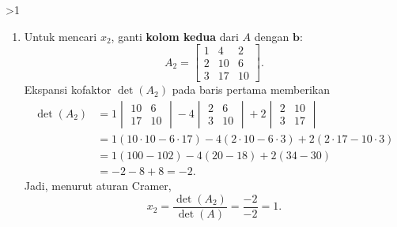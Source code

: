 \documentclass[12pt]{article}
\newenvironment{soaljawab}[1]{%
    \ifnum#1>1\clearpage\fi
    \begin{tcolorbox}[enhanced,breakable,height fill,height fixed for=all,
        sharp corners,colback=white,colframe=black,boxrule=0.4bp,
        boxsep=0pt,left=12bp,right=12bp,top=6bp,bottom=10bp,
        before skip=0pt,after skip=0pt,pad at break=8bp]
    \fontsize{12bp}{14bp}\selectfont
    \setlength{\abovedisplayskip}{8bp}
    \setlength{\belowdisplayskip}{8bp}
    \setlength{\abovedisplayshortskip}{8bp}
    \setlength{\belowdisplayshortskip}{8bp}
    \renewcommand{\arraystretch}{1.15}
    \begin{enumerate}[start=#1,topsep=0pt]
}{%
    \end{enumerate}
    \end{tcolorbox}
}
\begin{document}
\begin{soaljawab}{5}
\begin{enumerate}
Tanda kofaktor pada baris pertama adalah $+,-,+$, sehingga
\begin{align*}
    \det(A)
    &=1\begin{vmatrix}3&6\\6&10\end{vmatrix}
      -1\begin{vmatrix}2&6\\3&10\end{vmatrix}
      +2\begin{vmatrix}2&3\\3&6\end{vmatrix}\\
    &=1(3\cdot10-6\cdot6)-1(2\cdot10-6\cdot3)
      +2(2\cdot6-3\cdot3)\\
    &=1(30-36)-1(20-18)+2(12-9)\\
    &=-6-2+6=-2.
\end{align*}
Karena $\det(A)\ne0$, sistem memiliki solusi tunggal dan aturan Cramer dapat digunakan.

\item Untuk mencari $x_2$, ganti \textbf{kolom kedua} dari $A$ dengan $\mathbf b$:
\[
    A_2=\begin{bmatrix}1&4&2\\2&10&6\\3&17&10\end{bmatrix}.
\]
Ekspansi kofaktor $\det(A_2)$ pada baris pertama memberikan
\begin{align*}
    \det(A_2)
    &=1\begin{vmatrix}10&6\\17&10\end{vmatrix}
      -4\begin{vmatrix}2&6\\3&10\end{vmatrix}
      +2\begin{vmatrix}2&10\\3&17\end{vmatrix}\\
    &=1(10\cdot10-6\cdot17)-4(2\cdot10-6\cdot3)
      +2(2\cdot17-10\cdot3)\\
    &=1(100-102)-4(20-18)+2(34-30)\\
    &=-2-8+8=-2.
\end{align*}
Jadi, menurut aturan Cramer,
\[
    x_2=\frac{\det(A_2)}{\det(A)}=\frac{-2}{-2}=1.
\]
\end{enumerate}
\end{soaljawab}

\label{akhir-paket-7}
\end{document}

